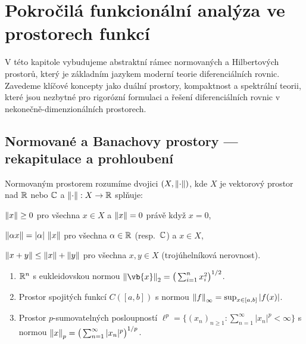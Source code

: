 \section{Pokročilá funkcionální analýza ve prostorech funkcí}
\label{sec:funkcionalni-analyza}

V této kapitole vybudujeme abstraktní rámec normovaných a Hilbertových prostorů, který je základním jazykem moderní teorie diferenciálních rovnic. Zavedeme klíčové koncepty jako duální prostory, kompaktnost a spektrální teorii, které jsou nezbytné pro rigorózní formulaci a řešení diferenciálních rovnic v nekonečně-dimenzionálních prostorech.

\spc

\subsection{Normované a Banachovy prostory — rekapitulace a prohloubení}
\label{subsec:banach-prostory}

\begin{definition}
\label{def:normovany-prostor}
Normovaným prostorem rozumíme dvojici $(X,\left\lVert \cdot \right\rVert)$, kde $X$ je vektorový prostor nad $\mathbb{R}$ nebo $\mathbb{C}$ a $\left\lVert \cdot \right\rVert:X\to\mathbb{R}$ splňuje:
\begin{romanenum}
\item $\left\lVert x \right\rVert\ge 0$ pro všechna $x\in X$ a $\left\lVert x \right\rVert=0$ právě když $x=0$,
\item $\left\lVert \alpha x \right\rVert=|\alpha|\,\left\lVert x \right\rVert$ pro všechna $\alpha\in\mathbb{R}$ (resp.\ $\mathbb{C}$) a $x\in X$,
\item $\left\lVert x+y \right\rVert\le \left\lVert x \right\rVert+\left\lVert y \right\rVert$ pro všechna $x,y\in X$ (trojúhelníková nerovnost).
\end{romanenum}
\end{definition}

\begin{example}
\label{ex:normovane-prostory}
\begin{enumerate}
\item $\mathbb{R}^n$ s eukleidovskou normou $\norm{\vb{x}}_2=\big(\sum_{i=1}^n x_i^2\big)^{1/2}$.
\item Prostor spojitých funkcí $C([a,b])$ s normou $\left\lVert f \right\rVert_\infty=\sup_{x\in[a,b]}|f(x)|$.
\item Prostor $p$-sumovatelných posloupností $\ell^p=\{(x_n)_{n\ge1}:\sum_{n=1}^\infty |x_n|^p<\infty\}$ s normou $\left\lVert x \right\rVert_p=\big(\sum_{n=1}^\infty |x_n|^p\big)^{1/p}$.
\end{enumerate}
\end{example}

